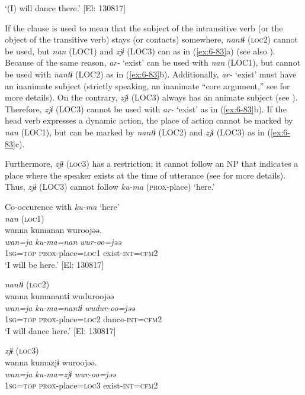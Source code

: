 \begin{table}
 \glt    ‘(I) will dance there.’ [El: 130817]

If the clause is used to mean that the subject of the intransitive verb (or the object of the transitive verb) stays (or contacts) somewhere, \textit{nantɨ} (\textsc{loc}2) cannot be used, but \textit{nan} (LOC1) and \textit{zjɨ} (LOC3) can as in (\ref{ex:6-83}a) (see also ). Because of the same reason, \textit{ar-} ‘exist’ can be used with \textit{nan} (LOC1), but cannot be used with \textit{nantɨ} (LOC2) as in (\ref{ex:6-83}b). Additionally, \textit{ar-} ‘exist’ must have an inanimate subject (strictly speaking, an inanimate “core argument,” see  for more details). On the contrary, \textit{zjɨ} (LOC3) always has an animate subject (see ). Therefore, \textit{zjɨ} (LOC3) cannot be used with \textit{ar-} ‘exist’ as in (\ref{ex:6-83}b). If the head verb expresses a dynamic action, the place of action cannot be marked by \textit{nan} (LOC1), but can be marked by \textit{nantɨ} (LOC2) and \textit{zjɨ} (LOC3) as in (\ref{ex:6-83}c).

  Furthermore, \textit{zjɨ} (\textsc{loc}3) has a restriction; it cannot follow an NP that indicates a place where the speaker exists at the time of utterance (see  for more details). Thus, \textit{zjɨ} (LOC3) cannot follow \textit{ku-ma} (\textsc{prox}-place) ‘here.’

\ea\label{ex:6-84}
 Co-occurence with \textit{ku-ma} ‘here’\\

 \ea \textit{nan} (\textsc{loc}1)\\
{\TM}
\glll  wanna  kumanan  wuroojəə.\\
\textit{wan=ja}  \textit{ku-ma=nan}  \textit{wur-oo=jəə}\\
1\textsc{sg}=\textsc{top}  \textsc{prox}-place=\textsc{loc}1  exist-\textsc{int}=\textsc{cfm}2\\
\glt ‘I will be here.’ [El: 130817]

\ex \textit{nantɨ} (\textsc{loc}2)\\
{\TM}
\glll  wanna  kumanantɨ  wuduroojəə\\
\textit{wan=ja}  \textit{ku-ma=nantɨ}  \textit{wudur-oo=jəə}\\
1\textsc{sg}=\textsc{top}  \textsc{prox}-place=\textsc{loc}2  dance-\textsc{int}=\textsc{cfm}2\\
\glt ‘I will dance here.’ [El: 130817]

\ex \textit{zjɨ} (\textsc{loc}3)\\
{\TM}
\glll  *wanna  kumazjɨ  wuroojəə.\\
\textit{wan=ja}  \textit{ku-ma=zjɨ}  \textit{wur-oo=jəə}\\
1\textsc{sg}=\textsc{top}  \textsc{prox}-place=\textsc{loc}3  exist-\textsc{int}=\textsc{cfm}2


\end{table}
